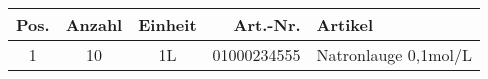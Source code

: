 \begin{longtable}{cccrX}
Pos. & Anzahl & Einheit & Art.-Nr. & Artikel\\
\endhead
\hline

1 & 10 & 1L & 01000234555 & Natronlauge 0,1mol/L\\

\end{longtable}